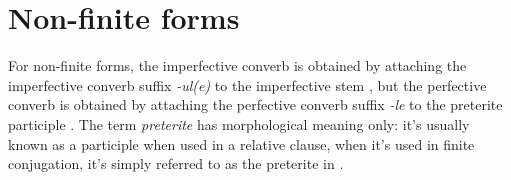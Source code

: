 \documentclass[a4paper, oneside, 12pt]{report}
\newcommand*{\citepage}[1]{p.~{#1}}
\newcommand*{\term}[1]{\emph{#1}}
\newcommand{\form}[1]{\emph{#1}}
\begin{document}
\section{Non-finite forms}

For non-finite forms, the imperfective converb 
is obtained by attaching the imperfective converb suffix \form{-ul(e)} to the imperfective stem
\citep[\citepage{306}]{forker2020grammar},
but the perfective converb is obtained by 
attaching the perfective converb suffix \form{-le} to the preterite participle 
\citep[\citepage{308}]{forker2020grammar}.
The term \term{preterite} has morphological meaning only:
it's usually known as a participle when used in a relative clause, 
when it's used in finite conjugation, 
it's simply referred to as the preterite in \citet{forker2020grammar}.



\end{document}
